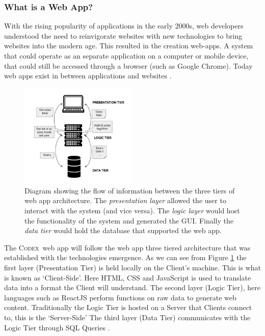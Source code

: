 \documentclass[final]{cmpreport}
\newcommand{\Codex}{\textsc{Codex}}
\begin{document}
			\subsubsection{What is a Web App?} \label{sec:what-web-app}
			With the rising popularity of applications in the early 2000s, web developers understood the need to reinvigorate websites with new technologies to bring websites into the modern age. This resulted in the creation web-apps. A system that could operate as an separate application on a computer or mobile device, that could still be accessed through a browser (such as Google Chrome). Today web apps exist in between applications and websites \citep{web-apps}. 
			
			\begin{figure}[h]
				\centering
				\includegraphics[width=0.5\textwidth]{Basic_Web_App_Architecture.PNG}
				\caption[Three Tiered Web App Architecture]{Diagram showing the flow of information between the three tiers of web app architecture. The \emph{presentation layer} allowed the user to interact with the system (and vice versa). The \emph{logic layer} would host the functionality of the system and generated the GUI. Finally the \emph{data tier} would hold the database that supported the web app.} \label{fig:web-apps}
			\end{figure}
		
			The \Codex \ web app will follow the web app three tiered architecture that was established with the technologies emergence. As we can see from Figure \ref{fig:web-apps} the first layer (Presentation Tier) is held locally on the Client's machine. This is what is known as `Client-Side'. Here HTML, CSS and JavaScript is used to translate data into a format the Client will understand. The second layer (Logic Tier), here languages such as ReactJS perform functions on raw data to generate web content. Traditionally the Logic Tier is hosted on a Server that Clients connect to, this is the `Server-Side' The third layer (Data Tier) communicates with the Logic Tier through SQL Queries \citep{SecurityWebApps}. 
			
\end{document}
